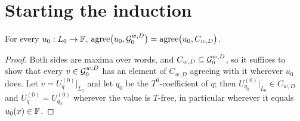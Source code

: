 \section{Starting the induction}

\begin{lemma}[Start]\label{lem:start}
For every $u_0:L_0\to\mathbb{F}$, $\mathrm{agree}\big(u_0,\mathcal{G}_0^{w,D}\big)=\mathrm{agree}\big(u_0,C_{w,D}\big)$.
\end{lemma}

\begin{proof}
Both sides are maxima over words, and $C_{w,D}\subseteq\mathcal{G}_0^{w,D}$, so it suffices to show
that every $v\in\mathcal{G}_0^{w,D}$ has an element of $C_{w,D}$ agreeing with it wherever $u_0$ does.
Let $v=U^{(0)}_q|_{L_0}$ and let $q_0$ be the $T^0$-coefficient of $q$; then
$U^{(0)}_{q_0}|_{L_0}\in C_{w,D}$ and $U^{(0)}_q=U^{(0)}_{q_0}$ wherever the value is
$T$-free, in particular wherever it equals $u_0(x)\in\mathbb{F}$.
\end{proof}
